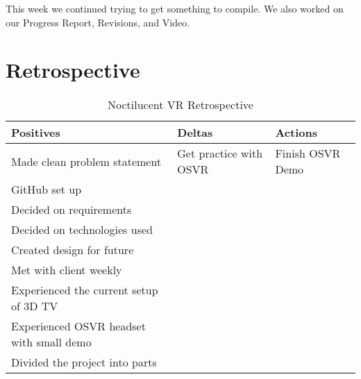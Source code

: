 \documentclass{article}
\begin{document}
This week we continued trying to get something to compile.
We also worked on our Progress Report, Revisions, and Video.

\section{Retrospective}

\begin{table}[ht]
\caption{Noctilucent VR Retrospective}
\centering
\begin{tabular}{l l l}
\hline\hline
Positives & Deltas & Actions \\ [0.5ex]
\hline
Made clean problem statement & Get practice with OSVR & Finish OSVR Demo \\
GitHub set up & & \\
Decided on requirements & & \\
Decided on technologies used & & \\
Created design for future &  & \\
Met with client weekly & & \\
Experienced the current setup of 3D TV & & \\
Experienced OSVR headset with small demo & & \\
Divided the project into parts & & \\ [1ex]
\hline
\end{tabular}
\end{table}
\end{document}
